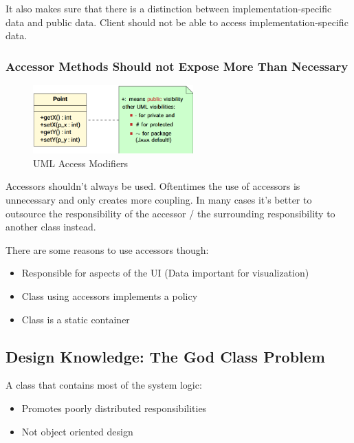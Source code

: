 \documentclass[
../../Software_Engineering_Summary.tex,
]
{subfiles}
\begin{document}
It also makes sure that there is a distinction between implementation-specific data and public data. Client should not be able to access implementation-specific data.

\subsubsection{Accessor Methods Should not Expose More Than Necessary}
\begin{figure}
    [htp]
    \centering
    \includegraphics[width = 0.55\textwidth]{Pics/07/UMLAccessModifiers.png}
    \caption{UML Access Modifiers}
\end{figure}

Accessors shouldn't always be used. Oftentimes the use of accessors is unnecessary and only creates more coupling. In many cases it's better to outsource the responsibility of the accessor / the surrounding responsibility to another class instead.

There are some reasons to use accessors though:
\begin{itemize}
    \item Responsible for aspects of the UI (Data important for visualization)
    \item Class using accessors implements a policy
    \item Class is a static container
\end{itemize}

\subsection{Design Knowledge: The God Class Problem}

\begin{defbox}
    A class that contains most of the system logic:
    \begin{itemize}
        \item Promotes poorly distributed responsibilities
        \item Not object oriented design
    \end{itemize}
\end{defbox}
\end{document}
